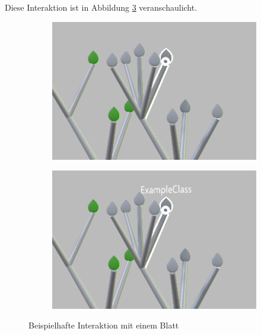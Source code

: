 Diese Interaktion ist in Abbildung \ref{fig:leaf-interaction} veranschaulicht.

\setlength{\fwidth}{.49\textwidth}
\begin{figure}[htb]
  \centering
  \begin{subfigure}[b]{\fwidth}
   \includegraphics[width=\textwidth]{figures/leaf-focused}
    \label{fig:leaf-focused}
  \end{subfigure}
  \hfill
  \begin{subfigure}[b]{\fwidth}
  	\includegraphics[width=\textwidth]{figures/leaf-clicked}
  	 \label{fig:leaf-clicked}
  \end{subfigure}
  \caption{Beispielhafte Interaktion mit einem Blatt} \label{fig:leaf-interaction}
\end{figure}

